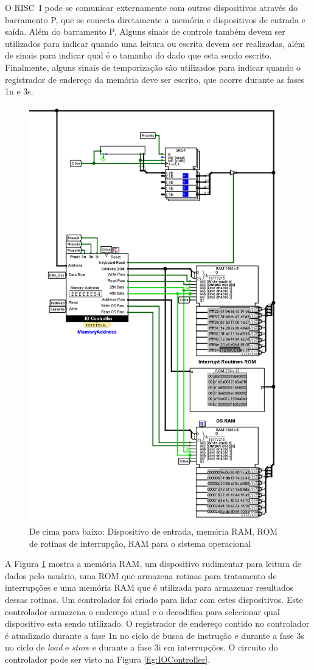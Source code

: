 \documentclass[
	article,			%
	11pt,				%
	oneside,			%
	a4paper,			%
	english,			%
	brazil,				%
	sumario=tradicional
	]{abntex2}
\begin{document}
O RISC~I pode se comunicar externamente com outros dispositivos através do barramento P, que se conecta diretamente a memória e dispositivos de entrada e saída. Além do barramento P, Alguns sinais de controle também devem ser utilizados para indicar quando uma leitura ou escrita devem ser realizadas, além de sinais para indicar qual é o tamanho do dado que esta sendo escrito. Finalmente, alguns sinais de temporização são utilizados para indicar quando o registrador de endereço da memória deve ser escrito, que ocorre durante as fases 1n e 3s. 
\begin{figure}[H]
    \centering
    \includegraphics[width=0.5\linewidth]{Logisim/inputoutput.png}
    \caption{De cima para baixo: Dispositivo de entrada, memória RAM, ROM de rotinas de interrupção, RAM para o sistema operacional}
    \label{fig:iodevices}
\end{figure}

A Figura \ref{fig:iodevices} mostra a memória RAM, um dispositivo rudimentar para leitura de dados pelo usuário, uma ROM que armazena rotinas para tratamento de interrupções e uma memória RAM que é utilizada para armazenar resultados dessas rotinas. Um controlador foi criado para lidar com estes dispositivos. Este controlador armazena o endereço atual e o decodifica para selecionar qual dispositivo esta sendo utilizado. O registrador de endereço contido no controlador é atualizado durante a fase 1n no ciclo de busca de instrução e durante a fase 3s no ciclo de \textit{load} e \textit{store} e durante a fase 3i em interrupções. O circuito do controlador pode ser visto na Figura \ref{fig:IOController}.
\end{document}
